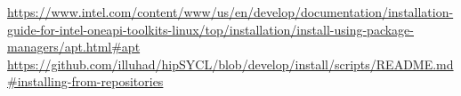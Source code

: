 

\urldef\oneapiaptinstall\url{https://www.intel.com/content/www/us/en/develop/documentation/installation-guide-for-intel-oneapi-toolkits-linux/top/installation/install-using-package-managers/apt.html#apt}
\urldef\hipsyclinstallfromrepos\url{https://github.com/illuhad/hipSYCL/blob/develop/install/scripts/README.md#installing-from-repositories}
